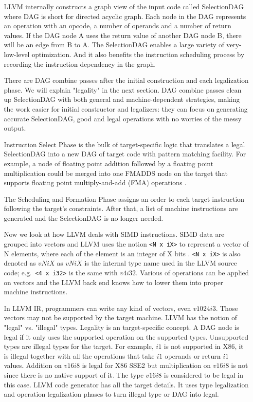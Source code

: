LLVM internally constructs a graph view of the input code called SelectionDAG where DAG is short for directed acyclic graph. Each node in the DAG represents an operation with an opcode, a number of operands and a number of return values. If the DAG node A uses the return value of another DAG node B, there will be an edge from B to A. The SelectionDAG enables a large variety of very-low-level optimization. And it also benefits the instruction scheduling process by recording the instruction dependency in the graph.

There are DAG combine passes after the initial construction and each legalization phase\cite{llvm_code_gen}. We will explain "legality" in the next section. DAG combine passes clean up SelectionDAG with both general and machine-dependent strategies, making the work easier for initial constructor and legalizers: they can focus on generating accurate SelectionDAG, good and legal operations with no worries of the messy output.

Instruction Select Phase is the bulk of target-specific logic that translates a legal SelectionDAG into a new DAG of target code with pattern matching facility. For example, a node of floating point addition followed by a floating point multiplication could be merged into one FMADDS node on the target that supports floating point multiply-and-add (FMA) operations \cite{llvm_code_gen}.

The Scheduling and Formation Phase assigns an order to each target instruction following the target's constraints. After that, a list of machine instructions are generated and the SelectionDAG is no longer needed.

Now we look at how LLVM deals with SIMD instructions. SIMD data are grouped into vectors and LLVM uses the notion \verb|<N x iX>| to represent a vector of N elements, where each of the element is an integer of X bits \cite{llvm_lang_ref, hybrid_simd_type_legalize}. \verb|<N x iX>| is also denoted as $vNiX$ as $vNiX$ is the internal type name used in the LLVM source code; e.g.\ \verb|<4 x i32>| is the same with $v4i32$. Various of operations can be applied on vectors and the LLVM back end knows how to lower them into proper machine instructions.

In LLVM IR, programmers can write any kind of vectors, even $v1024i3$. Those vectors may not be supported by the target machine. LLVM has the notion of "legal" vs. "illegal" types. Legality is an target-specific concept. A DAG node is legal if it only uses the supported operation on the supported types. Unsupported types are illegal types for the target. For example, $i1$ is not supported in X86, it is illegal together with all the operations that take $i1$ operands or return $i1$ values. Addition on $v16i8$ is legal for X86 SSE2 but multiplication on $v16i8$ is not since there is no native support of it. The type $v16i8$ is considered to be legal in this case. LLVM code generator has all the target details. It uses type legalization and operation legalization phases to turn illegal type or DAG into legal\cite{llvm_code_gen}.

